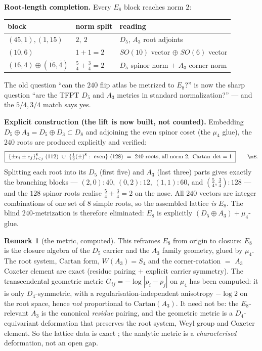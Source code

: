 \documentclass[11pt,a4paper]{article}
\theoremstyle{definition}
\newtheorem*{remark}{Remark}
\begin{document}
\noindent\textbf{Root-length completion.} Every $E_8$ block reaches norm $2$:
\begin{center}\small
\begin{tabularx}{\linewidth}{@{}llY@{}}
\toprule
block & norm split & reading \\
\midrule
$(45,1),(1,15)$ & $2,\ 2$ & $D_5$, $A_3$ root adjoints \\
$(10,6)$ & $1+1=2$ & $SO(10)$ vector $\oplus$ $SO(6)$ vector \\
$(16,4)\oplus(\overline{16},\overline4)$ & $\tfrac54+\tfrac34=2$ & $D_5$ spinor norm $+$ $A_3$ corner norm \\
\bottomrule
\end{tabularx}
\end{center}
The old question ``can the $240$ flip atlas be metrized to $E_8$?'' is now the sharp question ``are
the TFPT $D_5$ and $A_3$ metrics in standard normalization?'' --- and the $5/4,3/4$ match says yes.

\noindent\textbf{Explicit construction (the lift is now built, not counted).} Embedding
$D_5\oplus A_3=D_5\oplus D_3\subset D_8$ and adjoining the even spinor coset (the $\mu_4$ glue), the
$240$ roots are produced explicitly and verified:
\begin{equation}
  \boxed{\ \{\pm e_i\pm e_j\}_{i<j}^{8}\ (112)\ \cup\ \{\tfrac12(\pm)^8:\ \text{even}\}\ (128)
  \ =\ 240\ \text{roots, all norm }2,\ \text{Cartan }\det=1\ }\qquad\mE .
\end{equation}
Splitting each root into its $D_5$ (first five) and $A_3$ (last three) parts gives exactly the
branching blocks --- $(2,0)\!:\!40$, $(0,2)\!:\!12$, $(1,1)\!:\!60$, and $(\tfrac54,\tfrac34)\!:\!128$ ---
and the $128$ spinor roots realise $\tfrac54+\tfrac34=2$ on the nose. All $240$ vectors are integer
combinations of one set of $8$ simple roots, so the assembled lattice \emph{is} $E_8$. The blind
$240$-metrization is therefore eliminated: $E_8$ is explicitly $(D_5\oplus A_3)+\mu_4$-glue.
\begin{remark}[the metric, computed]
This reframes $E_8$ from origin to closure: $E_8$ is the closure algebra of the $D_5$ carrier and the
$A_3$ family geometry, glued by $\mu_4$. The root system, Cartan form, $W(A_3)=S_4$ and the
corner-rotation $=$ $A_3$ Coxeter element are exact (residue pairing $+$ explicit carrier symmetry).
The transcendental geometric metric $G_{ij}=-\log|p_i-p_j|$ on $\mu_4$ has been computed: it is only
$D_4$-symmetric, with a regularisation-independent anisotropy $-\log2$ on the root space, hence
\emph{not} proportional to $\mathrm{Cartan}(A_3)$. It need not be: the $E_8$-relevant $A_3$ is the
canonical \emph{residue} pairing, and the geometric metric is a $D_4$-equivariant deformation that
preserves the root system, Weyl group and Coxeter element. So the lattice data is exact \mE; the
analytic metric is a \emph{characterised} deformation, not an open gap.
\end{remark}
\end{document}
